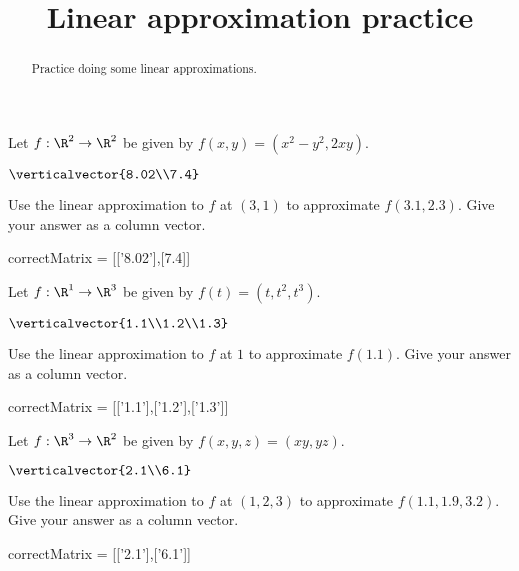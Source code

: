 \documentclass{ximera}
\title{Linear approximation practice}
\begin{document}
	\begin{abstract}
		Practice doing some linear approximations.
	\end{abstract}
	
	\begin{question}
		Let $f:\R^2 \to \R^2$ be given by $f(x,y) = (x^2-y^2,2xy)$.
		\begin{solution}
			\begin{hint}
				$\verticalvector{8.02\\7.4}$
			\end{hint}
			Use the linear approximation to $f$ at $(3,1)$ to approximate $f(3.1,2.3)$.  Give your answer as a column vector.
			\begin{matrix-answer}
				correctMatrix = [['8.02'],[7.4]]
			\end{matrix-answer}
		\end{solution}
	\end{question}
	
	\begin{question}
		Let $f:\R^1 \to \R^3$ be given by $f(t) = (t,t^2,t^3)$.
		\begin{solution}
			\begin{hint}
				$\verticalvector{1.1\\1.2\\1.3}$
			\end{hint}
			Use the linear approximation to $f$ at $1$ to approximate $f(1.1)$.  Give your answer as a column vector.
			\begin{matrix-answer}
				correctMatrix = [['1.1'],['1.2'],['1.3']]
			\end{matrix-answer}
		\end{solution}
	\end{question}
	
    \begin{question}
		Let $f:\R^3\to \R^2$ be given by $f(x,y,z) = (xy,yz)$.
		\begin{solution}
			\begin{hint}
				$\verticalvector{2.1\\6.1}$
			\end{hint}

			Use the linear approximation to $f$ at $(1,2,3)$ to approximate $f(1.1,1.9,3.2)$.  Give your answer as a column vector.
			\begin{matrix-answer}
				correctMatrix = [['2.1'],['6.1']]
			\end{matrix-answer}
		\end{solution}
	\end{question}	
\end{document}
